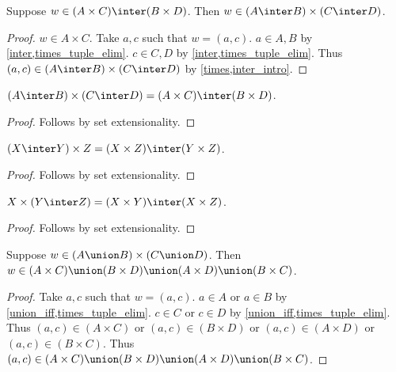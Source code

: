 \begin{proposition}\label{inter_times_elim}
    Suppose $w\in(A\times C)\inter (B\times D)$.
    Then $w\in(A\inter B)\times (C\inter D)$.
\end{proposition}
\begin{proof}
    $w\in A\times C$.
    Take $a, c$ such that $w = (a, c)$.
    $a\in A, B$ by \cref{inter,times_tuple_elim}.
    $c\in C, D$ by \cref{inter,times_tuple_elim}.
    Thus $(a,c) \in (A\inter B)\times (C\inter D)$ by \cref{times,inter_intro}.
\end{proof}

\begin{proposition}\label{inter_times}
    $(A\inter B)\times (C\inter D) = (A\times C)\inter (B\times D)$.
\end{proposition}
\begin{proof}
    Follows by set extensionality.
\end{proof}

\begin{proposition}\label{inter_times_right}
    $(X\inter Y)\times Z = (X\times Z)\inter (Y\times Z)$.
\end{proposition}
\begin{proof}
    Follows by set extensionality.
\end{proof}

\begin{proposition}\label{inter_times_left}
    $X\times (Y\inter Z) = (X\times Y)\inter (X\times Z)$.
\end{proposition}
\begin{proof}
    Follows by set extensionality.
\end{proof}

\begin{proposition}\label{union_times_intro}
    Suppose $w\in(A\union B)\times (C\union D)$.
    Then $w\in(A\times C)\union (B\times D)\union (A\times D)\union (B\times C)$.
\end{proposition}
\begin{proof}
    Take $a,c$ such that $w = (a, c)$.
    $a\in A$ or $a\in B$ by \cref{union_iff,times_tuple_elim}.
    $c\in C$ or $c\in D$ by \cref{union_iff,times_tuple_elim}.
    Thus $(a, c)\in (A\times C)$ or $(a, c)\in (B\times D)$ or $(a, c)\in (A\times D)$ or $(a, c)\in (B\times C)$.
    Thus $(a, c)\in (A\times C)\union (B\times D)\union (A\times D)\union (B\times C)$.
\end{proof}

